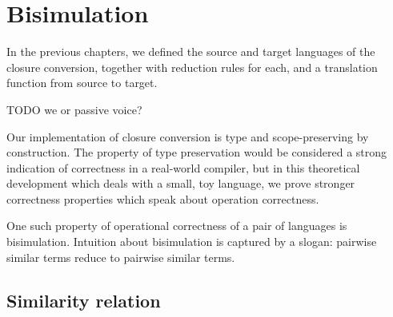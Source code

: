 \newcommand{\APT}{\AgdaPrimitiveType}
\newcommand{\AK}{\AgdaKeyword}
\newcommand{\AM}{\AgdaModule}
\newcommand{\AS}{\AgdaSymbol}
\newcommand{\AStr}{\AgdaString}
\newcommand{\AN}{\AgdaNumber}
\newcommand{\AD}{\AgdaDatatype}
\newcommand{\AF}{\AgdaFunction}
\newcommand{\AR}{\AgdaRecord}
\newcommand{\ARF}{\AgdaField}
\newcommand{\AB}{\AgdaBound}
\newcommand{\AIC}{\AgdaInductiveConstructor}
\newcommand{\ti}{\textasciitilde}

\chapter{Bisimulation}

In the previous chapters, we defined the source and target languages
of the closure conversion, together with reduction rules for each, and
a translation function from source to target.

TODO we or passive voice?

Our implementation of closure conversion is type and scope-preserving
by construction. The property of type preservation would be considered
a strong indication of correctness in a real-world compiler, but in
this theoretical development which deals with a small, toy language,
we prove stronger correctness properties which speak about operation
correctness.

One such property of operational correctness of a pair of languages is
bisimulation. Intuition about bisimulation is captured by a slogan: pairwise similar terms
reduce to pairwise similar terms. 

\section{Similarity relation}

